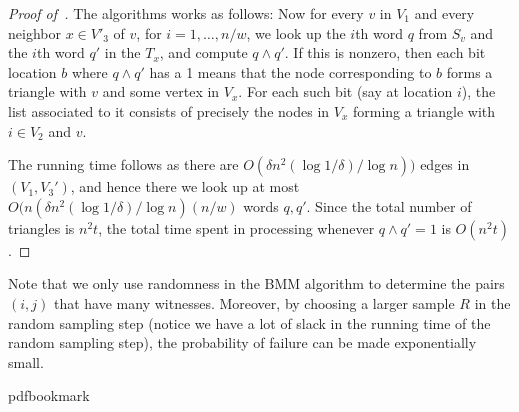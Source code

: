 \begin{proof}[Proof of~]
The algorithms works as follows: Now for every $v$ in $V_1$ and every neighbor $x \in V'_3$ of $v$, for $i=1,\ldots,n/w$, we look up
the $i$th word $q$ from $S_v$ and the $i$th word $q'$ in the $T_x$, and compute $q \wedge q'$. If this is nonzero, then each bit location $b$ where $q\wedge q'$ has a 1 means that the node corresponding to $b$ forms a triangle with $v$ and some vertex in $V_x$. For each such bit (say at location $i$), the list associated to it consists of precisely the nodes in $V_x$ forming a triangle with $i \in V_2$ and $v$.

The running time follows as there are $O(\delta n^2 (\log 1/\delta)/ \log n))$ edges in $(V_1,V_3')$, and hence there we look up at most $O(n (\delta n^2 (\log 1/\delta)/ \log n)  (n/w)$ words $q,q'$. Since the total number of triangles is $n^2 t$, the total time spent in processing whenever
 $q \wedge q'=1$ is $O(n^2 t)$.
\end{proof}


\begin{remark} Note that we only use randomness in the BMM algorithm  to determine the pairs $(i,j)$ that have many  witnesses.  Moreover, by choosing a larger sample $R$ in the random sampling step (notice we have a lot of slack in the running time of the random sampling step), the probability of failure can be made exponentially small.\end{remark}

%
%
%
%
%
\providecommand{\bibhead}[1]{}
%
\expandafter\ifx\csname pdfbookmark\endcsname\relax%
  \providecommand{\tocrefpdfbookmark}{}
\else\providecommand{\tocrefpdfbookmark}{%
   \hypertarget{tocreferences}{}%
   \pdfbookmark[1]{References}{tocreferences}}%
\fi

